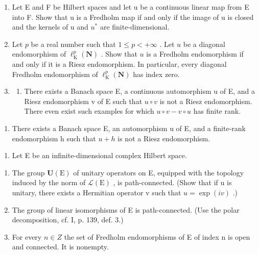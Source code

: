 \exercisesection{}

\begin{enumerate}
\def\labelenumi{\arabic{enumi})}
\item
  Let E and F be Hilbert spaces and let u be a continuous linear map from E into F. Show that u is a Fredholm map if and only if the image of u is closed and the kernels of u and \(u^{*}\) are finite-dimensional.
\item
  Let \(p\) be a real number such that \(1 \leqslant p < +\infty\) . Let \(u\) be a diagonal endomorphism of \(\ell_{\mathrm{K}}^{p}(\mathbf{N})\) . Show that \(u\) is a Fredholm endomorphism if and only if it is a Riesz endomorphism. In particular, every diagonal Fredholm endomorphism of \(\ell_{\mathrm{K}}^{p}(\mathbf{N})\) has index zero.
\item
  \begin{enumerate}
  \def\labelenumii{\alph{enumii})}
  \tightlist
  \item
    There exists a Banach space E, a continuous automorphism u of E, and a Riesz endomorphism v of E such that \(u \circ v\) is not a Riesz endomorphism. There even exist such examples for which \(u \circ v - v \circ u\) has finite rank.
  \end{enumerate}
\end{enumerate}

\begin{enumerate}
\def\labelenumi{\alph{enumi})}
\setcounter{enumi}{1}
\tightlist
\item
  There exists a Banach space E, an automorphism u of E, and a finite-rank endomorphism h such that \(u + h\) is not a Riesz endomorphism.
\end{enumerate}

\begin{enumerate}
\def\labelenumi{\arabic{enumi})}
\setcounter{enumi}{3}
\tightlist
\item
  Let E be an infinite-dimensional complex Hilbert space.
\end{enumerate}

\begin{enumerate}
\def\labelenumi{\alph{enumi})}
\item
  The group \(\mathbf{U}(\mathrm{E})\) of unitary operators on E, equipped with the topology induced by the norm of \(\mathcal{L}(\mathrm{E})\) , is path-connected. (Show that if u is unitary, there exists a Hermitian operator v such that \(u = \exp(iv)\) .)
\item
  The group of linear isomorphisms of E is path-connected. (Use the polar decomposition, cf. I, p. 139, def. 3.)
\item
  For every \(n \in Z\) the set of Fredholm endomorphisms of E of index n is open and connected. It is nonempty.
\end{enumerate}

